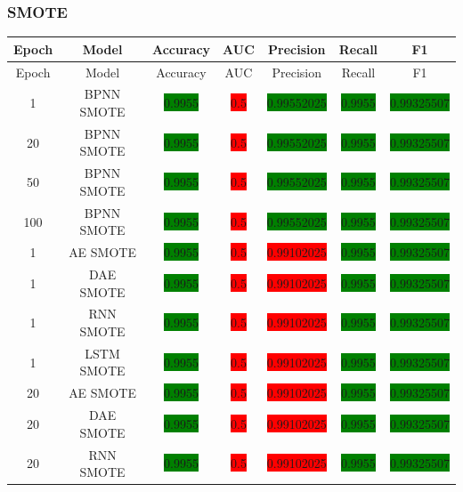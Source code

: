 \subsubsection{SMOTE}
\begin{longtable}{|c|c|c|c|c|c|c|}
	\hline
	Epoch & Model & Accuracy & AUC & Precision & Recall & F1\\ \hline
	\endfirsthead
	\hline
	Epoch & Model & Accuracy & AUC & Precision & Recall & F1\\ \hline
	\endhead
	1 & BPNN SMOTE & \colorbox{green}{0.9955} & \colorbox{red}{0.5} & \colorbox{green}{0.99552025} & \colorbox{green}{0.9955} & \colorbox{green}{0.99325507}\\ \hline
	20 & BPNN SMOTE & \colorbox{green}{0.9955} & \colorbox{red}{0.5} & \colorbox{green}{0.99552025} & \colorbox{green}{0.9955} & \colorbox{green}{0.99325507}\\ \hline
	50 & BPNN SMOTE & \colorbox{green}{0.9955} & \colorbox{red}{0.5} & \colorbox{green}{0.99552025} & \colorbox{green}{0.9955} & \colorbox{green}{0.99325507}\\ \hline
	100 & BPNN SMOTE & \colorbox{green}{0.9955} & \colorbox{red}{0.5} & \colorbox{green}{0.99552025} & \colorbox{green}{0.9955} & \colorbox{green}{0.99325507}\\ \hline
	1 & AE SMOTE & \colorbox{green}{0.9955} & \colorbox{red}{0.5} & \colorbox{red}{0.99102025} & \colorbox{green}{0.9955} & \colorbox{green}{0.99325507}\\ \hline
	1 & DAE SMOTE & \colorbox{green}{0.9955} & \colorbox{red}{0.5} & \colorbox{red}{0.99102025} & \colorbox{green}{0.9955} & \colorbox{green}{0.99325507}\\ \hline
	1 & RNN SMOTE & \colorbox{green}{0.9955} & \colorbox{red}{0.5} & \colorbox{red}{0.99102025} & \colorbox{green}{0.9955} & \colorbox{green}{0.99325507}\\ \hline
	1 & LSTM SMOTE & \colorbox{green}{0.9955} & \colorbox{red}{0.5} & \colorbox{red}{0.99102025} & \colorbox{green}{0.9955} & \colorbox{green}{0.99325507}\\ \hline
	20 & AE SMOTE & \colorbox{green}{0.9955} & \colorbox{red}{0.5} & \colorbox{red}{0.99102025} & \colorbox{green}{0.9955} & \colorbox{green}{0.99325507}\\ \hline
	20 & DAE SMOTE & \colorbox{green}{0.9955} & \colorbox{red}{0.5} & \colorbox{red}{0.99102025} & \colorbox{green}{0.9955} & \colorbox{green}{0.99325507}\\ \hline
	20 & RNN SMOTE & \colorbox{green}{0.9955} & \colorbox{red}{0.5} & \colorbox{red}{0.99102025} & \colorbox{green}{0.9955} & \colorbox{green}{0.99325507}\\ \hline

\end{longtable}
